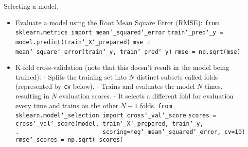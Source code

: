 Selecting a model.
\vspace{-3.0mm}
\begin{itemize}
\item
Evaluate a model using the Root Mean Square Error (RMSE):\newline
\texttt{from sklearn.metrics import mean\char`_squared\char`_error}\newline
\texttt{train\char`_pred\char`_y = model.predict(train\char`_X\char`_prepared)}\newline
\texttt{mse = mean\char`_square\char`_error(train\char`_y, train\char`_pred\char`_y)}\newline
\texttt{rmse = np.sqrt(mse)}
\item
K-fold cross-validation (note that this doesn't result in the model being trained):\newline
- Splits the training set into $N$ distinct subsets called folds (represented by \texttt{cv} below).\newline
- Trains and evaluates the model $N$ times, resulting in $N$ evaluation scores.\newline
- It selects a different fold for evaluation every time and trains on the other $N-1$ folds.\newline
\texttt{from sklearn.model\char`_selection import cross\char`_val\char`_score}\newline
\texttt{scores = cross\char`_val\char`_score(model, train\char`_X\char`_prepared, train\char`_y,}\newline
\texttt{.~~~~~~~~~~~~~~~~~~~~~~~~scoring=\textquotesingle neg\char`_mean\char`_squared\char`_error\textquotesingle, cv=10)}\newline
\texttt{rmse\char`_scores = np.sqrt(-scores)}

\end{itemize}
